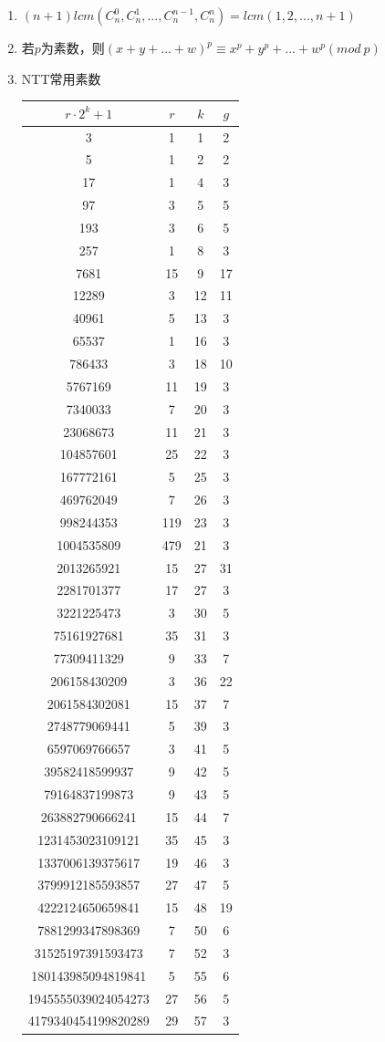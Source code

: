 \documentclass[a4paper,13.6pt]{article}
\begin{document}
\begin{CJK}{UTF8}{gbsn}
\begin{enumerate}
\item $(n+1)lcm(C_n^0,C_n^1,...,C_n^{n-1},C_n^{n})=lcm(1,2,...,n+1)$

\item 若$p$为素数，则$(x+y+...+w)^p\equiv x^p+y^p+...+w^p(mod\ p)$

\item NTT常用素数

\begin{tabular}{cccc}
    \hline
    $r⋅2^k+1$&$r$&$k$&$g$\\
    \hline
    3&1&1&2\\
    5&1&2&2\\
    17&1&4&3\\
    97&3&5&5\\
    193&3&6&5\\
    257&1&8&3\\
    7681&15&9&17\\
    12289&3&12&11\\
    40961&5&13&3\\
    65537&1&16&3\\
    786433&3&18&10\\
    5767169&11&19&3\\
    7340033&7&20&3\\
    23068673&11&21&3\\
    104857601&25&22&3\\
    167772161&5&25&3\\
    469762049&7&26&3\\
    998244353&119&23&3\\
    1004535809&479&21&3\\
    2013265921&15&27&31\\
    2281701377&17&27&3\\
    3221225473&3&30&5\\
    75161927681&35&31&3\\
    77309411329&9&33&7\\
    206158430209&3&36&22\\
    2061584302081&15&37&7\\
    2748779069441&5&39&3\\
    6597069766657&3&41&5\\
    39582418599937&9&42&5\\
    79164837199873&9&43&5\\
    263882790666241&15&44&7\\
    1231453023109121&35&45&3\\
    1337006139375617&19&46&3\\
    3799912185593857&27&47&5\\
    4222124650659841&15&48&19\\
    7881299347898369&7&50&6\\
    31525197391593473&7&52&3\\
    180143985094819841&5&55&6\\
    1945555039024054273&27&56&5\\
    4179340454199820289&29&57&3\\
    \hline
\end{tabular}
\end{enumerate}

\end{CJK}
\end{document}

